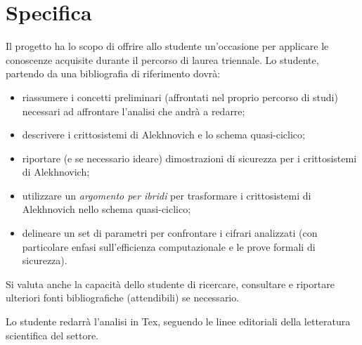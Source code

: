 \documentclass[12pt, a4paper]{report}
\theoremstyle{definition}
\begin{document}
		\section{Specifica}
			Il progetto ha lo scopo di offrire allo studente un'occasione per applicare le conoscenze acquisite durante il percorso di laurea triennale. Lo studente, partendo da una bibliografia di riferimento dovrà:
			\begin{itemize}
				\item riassumere i concetti preliminari (affrontati nel proprio percorso di studi) necessari ad affrontare l'analisi che andrà a redarre;
				\item descrivere i crittosistemi di Alekhnovich e lo schema quasi-ciclico;
				\item riportare (e se necessario ideare) dimostrazioni di sicurezza per i crittosistemi di Alekhnovich;
				\item utilizzare un \emph{argomento per ibridi} per trasformare i crittosistemi di Alekhnovich nello schema quasi-ciclico;
				\item delineare un set di parametri per confrontare i cifrari analizzati (con particolare enfasi sull'efficienza computazionale e le prove formali di sicurezza).
			\end{itemize}
			
			Si valuta anche la capacità dello studente di ricercare, consultare e riportare ulteriori fonti bibliografiche (attendibili) se necessario.
				
			Lo studente redarrà l'analisi in Tex, seguendo le linee editoriali della letteratura scientifica del settore.
\end{document}
